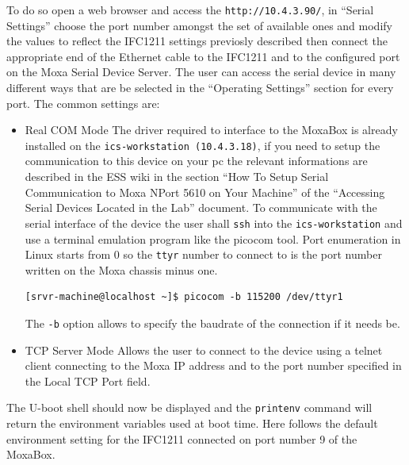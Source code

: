 \documentclass[11pt
  , a4paper
  , article
  , oneside
  , showtrims
]{memoir}
\begin{document}
To do so open a web browser and access the \texttt{http://10.4.3.90/}, in ``Serial Settings'' choose the port number amongst the set of available ones and modify the values to reflect the IFC1211 settings previosly described then connect the appropriate end of the Ethernet cable to the IFC1211 and to the configured port on the Moxa Serial Device Server.
The user can access the serial device in many different ways that are be selected in the ``Operating Settings'' section for every port. The common settings are:
\begin{itemize}
\item Real COM Mode
The driver required to interface to the MoxaBox is already installed on the \texttt{ics-workstation (10.4.3.18)}, if you need to setup the communication to this device on your pc the relevant informations are described in the ESS wiki in the section ``How To Setup Serial Communication to Moxa NPort 5610 on Your Machine'' of the ``Accessing Serial Devices Located in the Lab''\cite{ASDLL} document.
To communicate with the serial interface of the device the user shall \texttt{ssh} into the \texttt{ics-workstation} and use a terminal emulation program like the picocom tool. Port enumeration in Linux starts from 0 so the \texttt{ttyr} number to connect to is the port number written on the Moxa chassis minus one.
\begin{lstlisting}[style=termstyle]
[srvr-machine@localhost ~]$ picocom -b 115200 /dev/ttyr1
\end{lstlisting}
The \texttt{-b} option allows to specify the baudrate of the connection if it needs be.

\item TCP Server Mode
Allows the user to connect to the device using a telnet client connecting to the Moxa IP address and to the port number specified in the Local TCP Port field.
\end{itemize}

The U-boot shell should now be displayed and the \texttt{printenv} command will return the environment variables used at boot time. Here follows the default environment setting for the IFC1211 connected on port number 9 of the MoxaBox.
\end{document}
